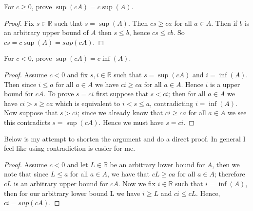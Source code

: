 \documentclass[11pt,largemargins]{homework}
\newcommand{\R}{\mathbb{R}}
\begin{document}
\begin{alphaparts}
    \questionpart
    For $c \geq 0$, prove $\sup(cA) = c\sup(A)$. 

    \begin{proof}
        Fix $s \in \R$ such that $s = \sup(A)$. Then $cs \geq ca $ for all $a \in A$. Then if $b$ is an arbitrary upper bound of $A$ then 
        $s \leq b$, hence $cs \leq cb$. So  $cs = c\sup(A) = sup(cA)$.
    \end{proof}

    \questionpart
    For $c < 0$, prove $\sup(cA) = c\inf(A)$. 

    \begin{proof}
        Assume $c < 0 $ and fix $s, i \in \R$ such that $s = \sup(cA)$ and $i = \inf(A)$. Then since $i \leq a$ for all $a \in A$ we have 
        $ci \geq ca$ for all $a \in A$. Hence $i$ is a upper bound for $cA$. To prove $s = ci$ first suppose that $s < ci$; then
        for all $a \in A$ we have $ci > s \geq ca$ which is equivalent to $i < s \leq a$, contradicting $i = \inf(A)$. Now suppose that 
        $s > ci$; since we already know that $ci \geq ca$ for all $a \in A$ we see this contradicts $s = \sup(cA)$. Hence we must have $s = ci$. 

    \end{proof}

    Below is my attempt to shorten the argument and do a direct proof. In general I feel like using contradiction is easier for me. 
    \begin{proof}
        Assume $c < 0$ and let $L \in \R$ be an arbitrary lower bound for $A$, then we note that since $L \leq a$ for all $a \in A$, we have that 
        $cL \geq ca$ for all $a \in A$; therefore $cL$ is an arbitrary upper bound for $cA$. Now we fix $i \in \R$ such that $i = \inf(A)$, then for our arbitrary lower bound L we have $i \geq L$ and $ci \leq cL$. Hence, $ci = sup(cA)$. 
    \end{proof}
\end{alphaparts}
\end{document}
